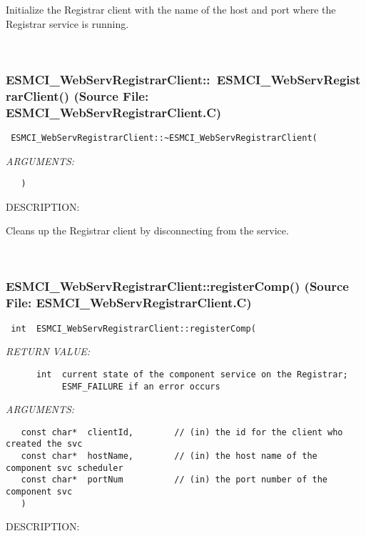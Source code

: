      Initialize the Registrar client with the name of the host and port
      where the Registrar service is running.
   
 
\mbox{}\hrulefill\
 
\subsubsection{ESMCI\_WebServRegistrarClient::~ESMCI\_WebServRegistrarClient() (Source File: ESMCI\_WebServRegistrarClient.C)}


  
\begin{verbatim} ESMCI_WebServRegistrarClient::~ESMCI_WebServRegistrarClient(\end{verbatim}{\em ARGUMENTS:}
\begin{verbatim}   )\end{verbatim}
{\sf DESCRIPTION:\\ }


      Cleans up the Registrar client by disconnecting from the service.
   
 
\mbox{}\hrulefill\
 
\subsubsection{ESMCI\_WebServRegistrarClient::registerComp() (Source File: ESMCI\_WebServRegistrarClient.C)}


  
\begin{verbatim} int  ESMCI_WebServRegistrarClient::registerComp(\end{verbatim}{\em RETURN VALUE:}
\begin{verbatim}      int  current state of the component service on the Registrar;
           ESMF_FAILURE if an error occurs\end{verbatim}{\em ARGUMENTS:}
\begin{verbatim}   const char*  clientId,        // (in) the id for the client who created the svc
   const char*  hostName,        // (in) the host name of the component svc scheduler
   const char*  portNum          // (in) the port number of the component svc
   )\end{verbatim}
{\sf DESCRIPTION:\\ }


